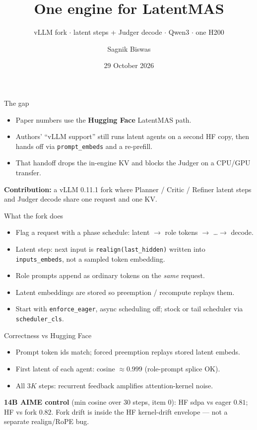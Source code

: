 \documentclass[aspectratio=169]{beamer}
\title{One engine for LatentMAS}
\subtitle{vLLM fork $\cdot$ latent steps + Judger decode $\cdot$ Qwen3 $\cdot$ one H200}
\author{Sagnik Biswas}
\date{29 October 2026}
\begin{document}
\begin{frame}
\titlepage
\end{frame}

\begin{frame}{The gap}

\begin{itemize}
  \item Paper numbers use the \textbf{Hugging Face} LatentMAS path.
  \item Authors' ``vLLM support'' still runs latent agents on a second HF copy, then hands off via \texttt{prompt\_embeds} and a re-prefill.
  \item That handoff drops the in-engine KV and blocks the Judger on a CPU/GPU transfer.
\end{itemize}

\vspace{0.5em}
\textbf{Contribution:} a vLLM 0.11.1 fork where Planner / Critic / Refiner latent steps and Judger decode share one request and one KV.

\end{frame}

\begin{frame}{What the fork does}

\begin{itemize}
  \item Flag a request with a phase schedule: latent $\rightarrow$ role tokens $\rightarrow$ \ldots $\rightarrow$ decode.
  \item Latent step: next input is \texttt{realign(last\_hidden)} written into \texttt{inputs\_embeds}, not a sampled token embedding.
  \item Role prompts append as ordinary tokens on the \emph{same} request.
  \item Latent embeddings are stored so preemption / recompute replays them.
  \item Start with \texttt{enforce\_eager}, async scheduling off; stock or tail scheduler via \texttt{scheduler\_cls}.
\end{itemize}

\end{frame}

\begin{frame}{Correctness vs Hugging Face}

\begin{itemize}
  \item Prompt token ids match; forced preemption replays stored latent embeds.
  \item First latent of each agent: cosine $\approx 0.999$ (role-prompt splice OK).
  \item All $3K$ steps: recurrent feedback amplifies attention-kernel noise.
\end{itemize}

\vspace{0.3em}
\textbf{14B AIME control} (min cosine over 30 steps, item 0): HF sdpa vs eager $0.81$; HF vs fork $0.82$.
Fork drift is inside the HF kernel-drift envelope --- not a separate realign/RoPE bug.

\end{frame}
\end{document}
